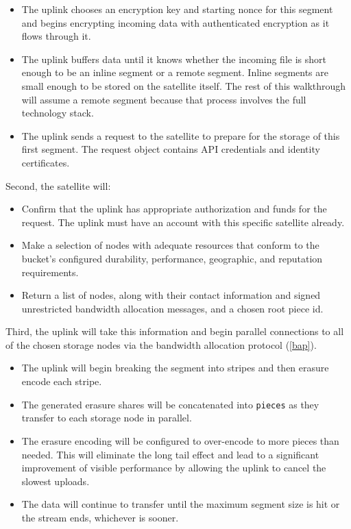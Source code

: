\documentclass[11pt,fleqn,openany]{book}
\newcommand{\x}[1]{{\tt #1}} \newcommand{\code}[1]{{\em #1}}
\begin{document}
\begin{itemize}
\item The uplink chooses an encryption key and starting nonce for
  this segment and begins encrypting incoming data with authenticated
  encryption as it flows through it.
\item The uplink buffers data until it knows whether the incoming file is
short enough to be an inline segment or a remote segment. Inline segments are
small enough to be stored on the satellite itself. The rest of this
walkthrough will assume a remote segment because that process involves the
full technology stack.
\item The uplink sends a request to the satellite to prepare for the storage
of this first segment. The request object contains API credentials and identity
certificates.
\end{itemize}

Second, the satellite will:
\begin{itemize}
\item Confirm that the uplink has appropriate authorization and funds for
  the request. The uplink must have an account with this specific satellite
  already.
\item Make a selection of nodes with adequate resources that conform to the
  bucket's configured durability, performance, geographic, and reputation
  requirements.
\item Return a list of nodes, along with their contact information and
  signed unrestricted bandwidth allocation messages, and a chosen root piece
  id.
\end{itemize}

Third, the uplink will take this information and begin parallel connections to
  all of the chosen storage nodes via the bandwidth allocation protocol
  (\ref{bap}).

\begin{itemize}
\item The uplink will begin breaking the segment into stripes and then
  erasure encode each stripe.
\item The generated erasure shares will be concatenated into \x{pieces} as they
  transfer to each storage node in parallel.
\item The erasure encoding will be configured to over-encode to more pieces
  than needed. This will eliminate the long tail effect and lead to a
  significant improvement of visible performance by allowing the uplink to
  cancel the slowest uploads.
\item The data will continue to transfer until the maximum segment size is hit
  or the stream ends, whichever is sooner.
\end{itemize}
\end{document}
